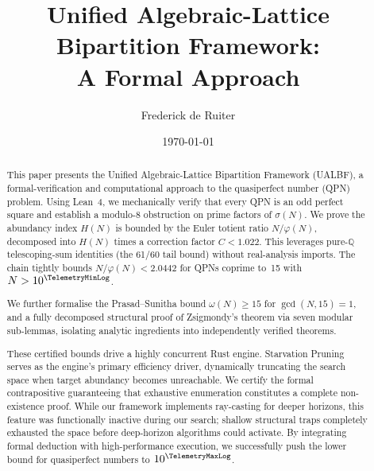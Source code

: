 \documentclass[11pt,a4paper]{article}
\title{Unified Algebraic-Lattice Bipartition Framework:\\
       A Formal Approach}
\author{Frederick de Ruiter}
\date{\today}
\begin{document}


\maketitle

\begin{abstract}
This paper presents the Unified Algebraic-Lattice Bipartition Framework
(UALBF), a formal-verification and computational
approach to the quasiperfect number (QPN) problem. Using Lean~4,
we mechanically verify that every QPN is an odd perfect square and
establish a modulo-8 obstruction on prime factors of $\sigma(N)$.
We prove the abundancy index $H(N)$ is bounded by the Euler
totient ratio $N/\varphi(N)$, decomposed into $H(N)$ times a correction
factor $C < 1.022$. This leverages pure-$\mathbb{Q}$ telescoping-sum identities
(the 61/60 tail bound) without real-analysis imports. The chain
tightly bounds $N/\varphi(N) < 2.0442$ for QPNs coprime to~15 with $N > 10^{\TelemetryMinLog}$.

We further formalise the Prasad--Sunitha bound $\omega(N)\ge 15$ for
$\gcd(N,15)=1$, and a fully decomposed structural proof of Zsigmondy's
theorem via seven modular sub-lemmas, isolating analytic ingredients
into independently verified theorems.

These certified bounds drive a highly concurrent Rust engine.
Starvation Pruning serves as the engine's primary efficiency driver,
dynamically truncating the search space when target abundancy becomes
unreachable. We certify the formal contrapositive guaranteeing that
exhaustive enumeration constitutes a complete non-existence proof.
While our framework implements ray-casting for deeper horizons,
this feature was functionally inactive during our search;
shallow structural traps completely exhausted the space before
deep-horizon algorithms could activate. By integrating formal
deduction with high-performance execution, we successfully
push the lower bound for quasiperfect numbers to $10^{\TelemetryMaxLog}$.
\end{abstract}












\end{document}
